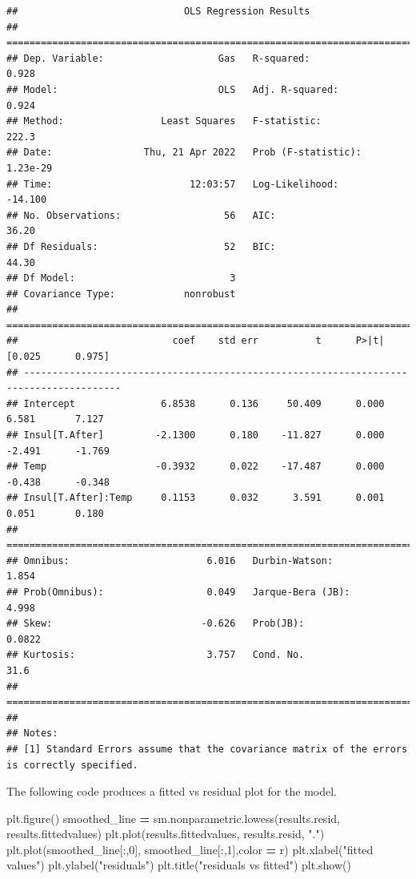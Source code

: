 \documentclass[
]{book}
\newenvironment{Shaded}{\begin{snugshade}}{\end{snugshade}}
\newcommand{\DecValTok}[1]{\textcolor[rgb]{0.00,0.00,0.81}{#1}}
\newcommand{\NormalTok}[1]{#1}
\newcommand{\OperatorTok}[1]{\textcolor[rgb]{0.81,0.36,0.00}{\textbf{#1}}}
\newcommand{\StringTok}[1]{\textcolor[rgb]{0.31,0.60,0.02}{#1}}
\begin{document}
\begin{verbatim}
##                             OLS Regression Results                            
## ==============================================================================
## Dep. Variable:                    Gas   R-squared:                       0.928
## Model:                            OLS   Adj. R-squared:                  0.924
## Method:                 Least Squares   F-statistic:                     222.3
## Date:                Thu, 21 Apr 2022   Prob (F-statistic):           1.23e-29
## Time:                        12:03:57   Log-Likelihood:                -14.100
## No. Observations:                  56   AIC:                             36.20
## Df Residuals:                      52   BIC:                             44.30
## Df Model:                           3                                         
## Covariance Type:            nonrobust                                         
## =======================================================================================
##                           coef    std err          t      P>|t|      [0.025      0.975]
## ---------------------------------------------------------------------------------------
## Intercept               6.8538      0.136     50.409      0.000       6.581       7.127
## Insul[T.After]         -2.1300      0.180    -11.827      0.000      -2.491      -1.769
## Temp                   -0.3932      0.022    -17.487      0.000      -0.438      -0.348
## Insul[T.After]:Temp     0.1153      0.032      3.591      0.001       0.051       0.180
## ==============================================================================
## Omnibus:                        6.016   Durbin-Watson:                   1.854
## Prob(Omnibus):                  0.049   Jarque-Bera (JB):                4.998
## Skew:                          -0.626   Prob(JB):                       0.0822
## Kurtosis:                       3.757   Cond. No.                         31.6
## ==============================================================================
## 
## Notes:
## [1] Standard Errors assume that the covariance matrix of the errors is correctly specified.
\end{verbatim}

The following code produces a fitted vs residual plot for the model.

\begin{Shaded}
\begin{Highlighting}[]
\NormalTok{plt.figure()}
\NormalTok{smoothed\_line }\OperatorTok{=}\NormalTok{ sm.nonparametric.lowess(results.resid, results.fittedvalues)}
\NormalTok{plt.plot(results.fittedvalues, results.resid, }\StringTok{"."}\NormalTok{)}
\NormalTok{plt.plot(smoothed\_line[:,}\DecValTok{0}\NormalTok{], smoothed\_line[:,}\DecValTok{1}\NormalTok{],color }\OperatorTok{=} \StringTok{\textquotesingle{}r\textquotesingle{}}\NormalTok{)}
\NormalTok{plt.xlabel(}\StringTok{"fitted values"}\NormalTok{)}
\NormalTok{plt.ylabel(}\StringTok{"residuals"}\NormalTok{)}
\NormalTok{plt.title(}\StringTok{"residuals vs fitted"}\NormalTok{)}
\NormalTok{plt.show()}
\end{Highlighting}
\end{Shaded}
\end{document}
